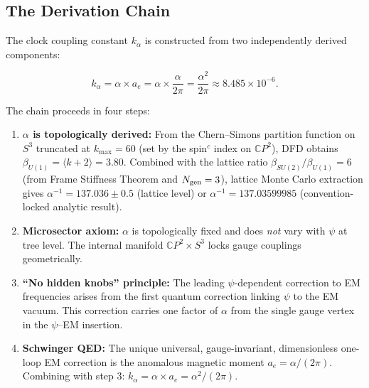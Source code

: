 \documentclass[11pt]{article}
\newcommand{\kalpha}{k_\alpha}
\theoremstyle{definition}
\theoremstyle{remark}
\begin{document}
\subsection{The Derivation Chain}

The clock coupling constant $\kalpha$ is constructed from two independently
derived components:

\begin{tcolorbox}[colback=green!5!white, colframe=green!60!black,
  title={$\kalpha$ Derivation Chain}]
\begin{equation}\label{eq:kalpha}
\boxed{\kalpha = \alpha \times a_e = \alpha \times \frac{\alpha}{2\pi}
= \frac{\alpha^2}{2\pi} \approx 8.485 \times 10^{-6}.}
\end{equation}
\end{tcolorbox}

The chain proceeds in four steps:

\begin{enumerate}
\item \textbf{$\alpha$ is topologically derived:} From the Chern--Simons
  partition function on $S^3$ truncated at $k_{\max} = 60$ (set by the
  spin$^c$ index on $\mathbb{C}P^2$), DFD obtains
  $\beta_{U(1)} = \langle k + 2 \rangle = 3.80$. Combined with the
  lattice ratio $\beta_{SU(2)}/\beta_{U(1)} = 6$ (from Frame Stiffness
  Theorem and $N_{\rm gen} = 3$), lattice Monte Carlo extraction gives
  $\alpha^{-1} = 137.036 \pm 0.5$ (lattice level) or
  $\alpha^{-1} = 137.03599985$ (convention-locked analytic result).

\item \textbf{Microsector axiom:} $\alpha$ is topologically fixed and
  does \emph{not} vary with $\psi$ at tree level. The internal manifold
  $\mathbb{C}P^2 \times S^3$ locks gauge couplings geometrically.

\item \textbf{``No hidden knobs'' principle:} The leading $\psi$-dependent
  correction to EM frequencies arises from the first quantum correction
  linking $\psi$ to the EM vacuum. This correction carries one factor
  of $\alpha$ from the single gauge vertex in the $\psi$--EM insertion.

\item \textbf{Schwinger QED:} The unique universal, gauge-invariant,
  dimensionless one-loop EM correction is the anomalous magnetic moment
  $a_e = \alpha/(2\pi)$. Combining with step 3:
  $\kalpha = \alpha \times a_e = \alpha^2/(2\pi)$.
\end{enumerate}
\end{document}
